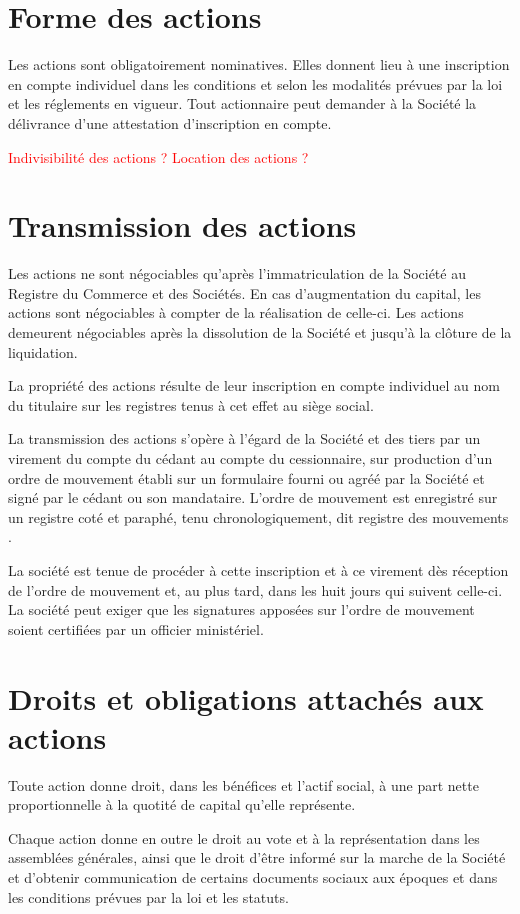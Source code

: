 \documentclass[a4paper,12pt]{report}
\begin{document}
\section{Forme des actions}
Les actions sont obligatoirement nominatives. 
Elles donnent lieu à une inscription en compte individuel dans les conditions et selon les modalités prévues par la loi et les réglements en vigueur. 
Tout actionnaire peut demander à la Société la délivrance d'une attestation d'inscription en compte.

\textcolor{red}{Indivisibilité des actions ?}
\textcolor{red}{Location des actions ?}

\section{Transmission des actions}
Les actions ne sont négociables qu'après l'immatriculation de la Société au Registre du Commerce et des Sociétés. 
En cas d'augmentation du capital, les actions sont négociables à compter de la réalisation de celle-ci. 
Les actions demeurent négociables après la dissolution de la Société et jusqu'à la clôture de la liquidation.

La propriété des actions résulte de leur inscription en compte individuel au nom du titulaire sur les registres tenus à cet effet au siège social.

La transmission des actions s'opère à l'égard de la Société et des tiers par un virement du compte du cédant au compte du cessionnaire, 
sur production d'un ordre de mouvement établi sur un formulaire fourni ou agréé par la Société et signé par le cédant ou son mandataire. 
L'ordre de mouvement est enregistré sur un registre coté et paraphé, tenu chronologiquement, dit \og registre des mouvements \fg{}.

La société est tenue de procéder à cette inscription et à ce virement dès réception de l'ordre de mouvement et, au plus tard, dans les huit jours qui suivent celle-ci. 
La société peut exiger que les signatures apposées sur l'ordre de mouvement soient certifiées par un officier ministériel.

\section{Droits et obligations attachés aux actions}
Toute action donne droit, dans les bénéfices et l'actif social, à une part nette proportionnelle à la quotité de capital qu'elle représente.

Chaque action donne en outre le droit au vote et à la représentation dans les assemblées générales, 
ainsi que le droit d'être informé sur la marche de la Société et d'obtenir communication de certains documents sociaux aux époques et dans les conditions prévues par la loi et les statuts.
\end{document}
